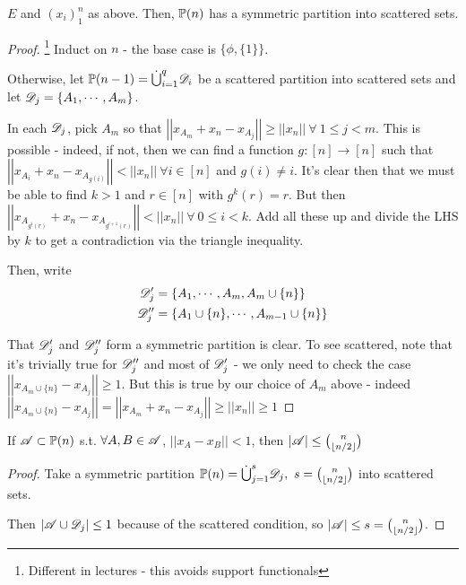 \documentclass[a4paper]{article}
\begin{document}
\begin{thm-num}[Kleitman, 1970]
	$E$ and $(x_i)_1^n$ as above. Then, $\P(n)$ has a symmetric partition into scattered sets.
\end{thm-num}
\begin{proof}\footnote{Different in lectures - this avoids support functionals}
	Induct on $n$ - the base case is $\{\phi,\{1\}\}$.
	
	Otherwise, let $\P(n-1)=\dot{\bigcup}_{i=1}^{q}\calD_i$ be a scattered partition into scattered sets and let $\calD_j=\{A_1,\cdots,A_m\}$.
	
	In each $\calD_j$, pick $A_m$ so that $\left|\left|x_{A_m} + x_n - x_{A_j}\right|\right|\geq \left|\left|x_n\right|\right|\ \forall\ 1\leq j<m$. This is possible - indeed, if not, then we can find a function $g:[n]\rightarrow[n]$ such that $\left|\left|x_{A_i} + x_n - x_{A_{g(i)}}\right|\right|< \left|\left|x_n\right|\right|\ \forall i\in[n]$ and $g(i)\neq i$. It's clear then that we must be able to find $k>1$ and $r\in[n]$ with $g^k(r)=r$. But then $\left|\left|x_{A_{g^i(r)}} + x_n - x_{A_{g^{i+1}(r)}}\right|\right|< \left|\left|x_n\right|\right|\ \forall\ 0\leq i<k$. Add all these up and divide the LHS by $k$ to get a contradiction via the triangle inequality.
	
	Then, write
	\begin{align*}
	\calD_j'&=\{A_1,\cdots,A_m,A_m\cup\{n\}\}\\
	\calD_j''&=\{A_1\cup\{n\},\cdots,A_{m-1}\cup\{n\}\}
	\end{align*}
	
	That $\calD_j'$ and $\calD_j''$ form a symmetric partition is clear. To see scattered, note that it's trivially true for $\calD_j''$ and most of $\calD_j'$ - we only need to check the case $\left|\left|x_{A_m\cup\{n\}}-x_{A_j}\right|\right|\geq 1$. But this is true by our choice of $A_m$ above - indeed $\left|\left|x_{A_m\cup\{n\}} - x_{A_j}\right|\right|=\left|\left|x_{A_m} + x_n - x_{A_j}\right|\right|\geq \left|\left|x_n\right|\right|\geq1$
\end{proof}

\begin{thm-num}
	If $\A\subset\P(n)$ s.t. $\forall A,B\in\A$, $\left|\left|x_A - x_B\right|\right|<1$, then $|\A|\leq\binom{n}{\lf n/2\rf}$
\end{thm-num}
\begin{proof}
	Take a symmetric partition $\P(n)=\dot{\bigcup}_{j=1}^{s}\calD_j,\ s=\binom{n}{\lf n/2\rf}$ into scattered sets.
	
	Then $\left|\A\cup\calD_j\right|\leq 1$ because of the scattered condition, so $|\A|\leq s=\binom{n}{\lf n/2\rf}$.
\end{proof}
\end{document}
